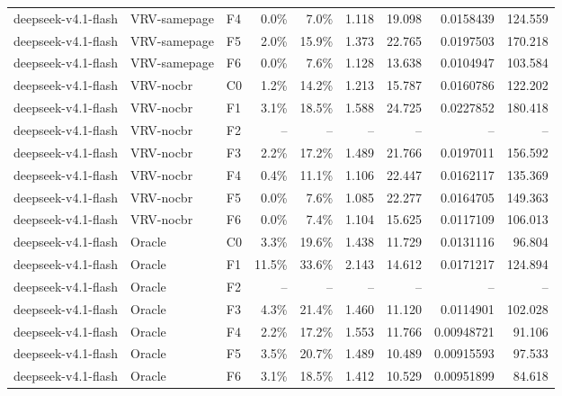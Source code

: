 \begin{tabular}{lllrrrrrr}
deepseek-v4.1-flash & VRV-samepage & F4 & 0.0\% & 7.0\% & 1.118 & 19.098 & 0.0158439 & 124.559 \\
deepseek-v4.1-flash & VRV-samepage & F5 & 2.0\% & 15.9\% & 1.373 & 22.765 & 0.0197503 & 170.218 \\
deepseek-v4.1-flash & VRV-samepage & F6 & 0.0\% & 7.6\% & 1.128 & 13.638 & 0.0104947 & 103.584 \\
deepseek-v4.1-flash & VRV-nocbr & C0 & 1.2\% & 14.2\% & 1.213 & 15.787 & 0.0160786 & 122.202 \\
deepseek-v4.1-flash & VRV-nocbr & F1 & 3.1\% & 18.5\% & 1.588 & 24.725 & 0.0227852 & 180.418 \\
deepseek-v4.1-flash & VRV-nocbr & F2 & -- & -- & -- & -- & -- & -- \\
deepseek-v4.1-flash & VRV-nocbr & F3 & 2.2\% & 17.2\% & 1.489 & 21.766 & 0.0197011 & 156.592 \\
deepseek-v4.1-flash & VRV-nocbr & F4 & 0.4\% & 11.1\% & 1.106 & 22.447 & 0.0162117 & 135.369 \\
deepseek-v4.1-flash & VRV-nocbr & F5 & 0.0\% & 7.6\% & 1.085 & 22.277 & 0.0164705 & 149.363 \\
deepseek-v4.1-flash & VRV-nocbr & F6 & 0.0\% & 7.4\% & 1.104 & 15.625 & 0.0117109 & 106.013 \\
deepseek-v4.1-flash & Oracle & C0 & 3.3\% & 19.6\% & 1.438 & 11.729 & 0.0131116 & 96.804 \\
deepseek-v4.1-flash & Oracle & F1 & 11.5\% & 33.6\% & 2.143 & 14.612 & 0.0171217 & 124.894 \\
deepseek-v4.1-flash & Oracle & F2 & -- & -- & -- & -- & -- & -- \\
deepseek-v4.1-flash & Oracle & F3 & 4.3\% & 21.4\% & 1.460 & 11.120 & 0.0114901 & 102.028 \\
deepseek-v4.1-flash & Oracle & F4 & 2.2\% & 17.2\% & 1.553 & 11.766 & 0.00948721 & 91.106 \\
deepseek-v4.1-flash & Oracle & F5 & 3.5\% & 20.7\% & 1.489 & 10.489 & 0.00915593 & 97.533 \\
deepseek-v4.1-flash & Oracle & F6 & 3.1\% & 18.5\% & 1.412 & 10.529 & 0.00951899 & 84.618 \\
\bottomrule
\end{tabular}

